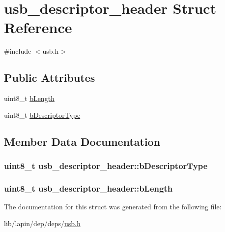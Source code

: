 \hypertarget{structusb__descriptor__header}{\section{usb\-\_\-descriptor\-\_\-header Struct Reference}
\label{structusb__descriptor__header}
}


{\ttfamily \#include $<$usb.\-h$>$}

\subsection*{Public Attributes}
\begin{DoxyCompactItemize}
\item 
uint8\-\_\-t \hyperlink{structusb__descriptor__header_a686afe54eba39501b3edd76dfdba743c}{b\-Length}
\item 
uint8\-\_\-t \hyperlink{structusb__descriptor__header_ab062652e1ace24a34e223c565a84a5d6}{b\-Descriptor\-Type}
\end{DoxyCompactItemize}


\subsection{Member Data Documentation}
\hypertarget{structusb__descriptor__header_ab062652e1ace24a34e223c565a84a5d6}{
\subsubsection[{b\-Descriptor\-Type}]{\setlength{\rightskip}{0pt plus 5cm}uint8\-\_\-t usb\-\_\-descriptor\-\_\-header\-::b\-Descriptor\-Type}}\label{structusb__descriptor__header_ab062652e1ace24a34e223c565a84a5d6}
\hypertarget{structusb__descriptor__header_a686afe54eba39501b3edd76dfdba743c}{
\subsubsection[{b\-Length}]{\setlength{\rightskip}{0pt plus 5cm}uint8\-\_\-t usb\-\_\-descriptor\-\_\-header\-::b\-Length}}\label{structusb__descriptor__header_a686afe54eba39501b3edd76dfdba743c}


The documentation for this struct was generated from the following file\-:\begin{DoxyCompactItemize}
\item 
lib/lapin/dep/deps/\hyperlink{deps_2usb_8h}{usb.\-h}\end{DoxyCompactItemize}
